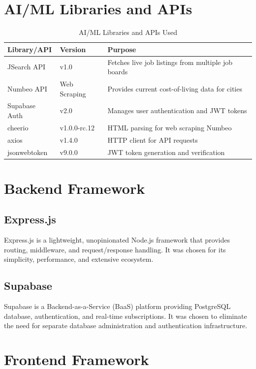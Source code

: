 \section{AI/ML Libraries and APIs}

\begin{table}[H]
\centering
\caption{AI/ML Libraries and APIs Used}
\label{tab:libraries}
\begin{tabular}{|l|l|p{5cm}|}
\hline
\textbf{Library/API} & \textbf{Version} & \textbf{Purpose} \\
\hline
JSearch API & v1.0 & Fetches live job listings from multiple job boards \\
\hline
Numbeo API & Web Scraping & Provides current cost-of-living data for cities \\
\hline
Supabase Auth & v2.0 & Manages user authentication and JWT tokens \\
\hline
cheerio & v1.0.0-rc.12 & HTML parsing for web scraping Numbeo \\
\hline
axios & v1.4.0 & HTTP client for API requests \\
\hline
jsonwebtoken & v9.0.0 & JWT token generation and verification \\
\hline
\end{tabular}
\end{table}

\section{Backend Framework}

\subsection{Express.js}

Express.js is a lightweight, unopinionated Node.js framework that provides routing, middleware, and request/response handling. It was chosen for its simplicity, performance, and extensive ecosystem.

\subsection{Supabase}

Supabase is a Backend-as-a-Service (BaaS) platform providing PostgreSQL database, authentication, and real-time subscriptions. It was chosen to eliminate the need for separate database administration and authentication infrastructure.

\section{Frontend Framework}

